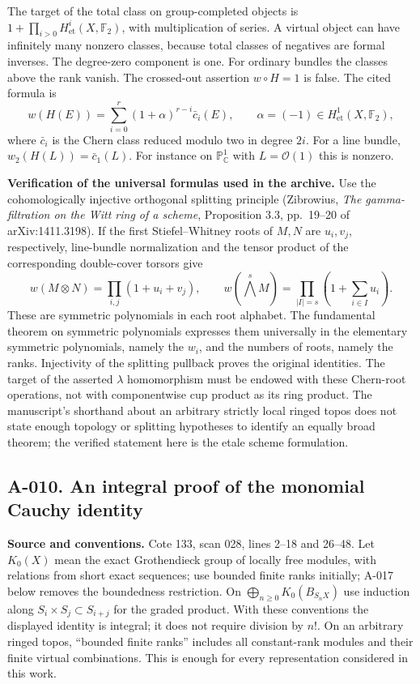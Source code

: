 The target of the total class on group-completed objects is
$1+\prod_{i>0}H^i_{\mathrm{et}}(X,\mathbb F_2)$, with multiplication of
series. A virtual object can have infinitely many nonzero classes,
because total classes of negatives are formal inverses. The degree-zero
component is one. For ordinary bundles the classes above the rank vanish.
The crossed-out assertion $w\circ H=1$ is false. The cited formula is
\[
 w(H(E))=\sum_{i=0}^{r}(1+\alpha)^{r-i}\bar c_i(E),
 \qquad \alpha=(-1)\in H^1_{\mathrm{et}}(X,\mathbb F_2),
\]
where $\bar c_i$ is the Chern class reduced modulo two in degree $2i$.
For a line bundle, $w_2(H(L))=\bar c_1(L)$. For instance on
$\mathbb P^1_{\mathbb C}$ with $L=\mathcal O(1)$ this is nonzero.

\textbf{Verification of the universal formulas used in the archive.}
Use the cohomologically injective orthogonal splitting principle
(Zibrowius, \emph{The gamma-filtration on the Witt ring of a scheme},
Proposition 3.3, pp.~19--20 of arXiv:1411.3198). If the first
Stiefel--Whitney roots of $M,N$ are $u_i,v_j$, respectively, line-bundle
normalization and the tensor product of the corresponding double-cover
torsors give
\[
 w(M\otimes N)=\prod_{i,j}(1+u_i+v_j),\qquad
 w(\bigwedge^sM)=\prod_{|I|=s}\left(1+\sum_{i\in I}u_i\right).
\]
These are symmetric polynomials in each root alphabet. The fundamental
theorem on symmetric polynomials expresses them universally in the
elementary symmetric polynomials, namely the $w_i$, and the numbers of
roots, namely the ranks. Injectivity of the splitting pullback proves
the original identities. The target of the asserted $\lambda$
homomorphism must be endowed with these Chern-root operations, not with
componentwise cup product as its ring product. The manuscript's
shorthand about an arbitrary strictly local ringed topos does not state
enough topology or splitting hypotheses to identify an equally broad
theorem; the verified statement here is the etale scheme formulation.

\subsection*{A-010. An integral proof of the monomial Cauchy identity}
\textbf{Source and conventions.} Cote 133, scan 028, lines 2--18 and
26--48. Let $K_0(X)$ mean the exact Grothendieck group of locally free
modules, with relations from short exact sequences; use bounded finite
ranks initially; A-017 below removes the boundedness restriction.
On $\bigoplus_{n\geq0}K_0(B_{S_nX})$ use induction along
$S_i\times S_j\subset S_{i+j}$ for the graded product. With these
conventions the displayed identity is integral; it does not require
division by $n!$. On an arbitrary ringed topos, ``bounded finite ranks''
includes all constant-rank modules and their finite virtual combinations.
This is enough for every representation considered in this work.

